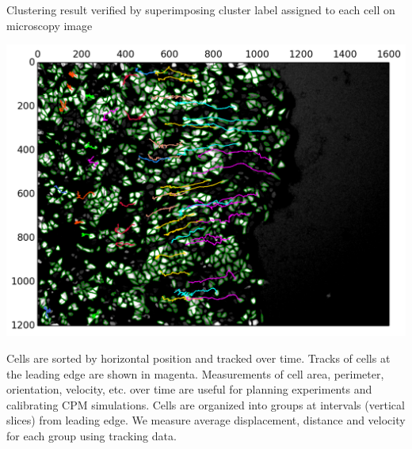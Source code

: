 \documentclass[a0paper,portrait,twocolumn]{baposter}
\begin{document}
\begin{poster}
{\begin{multicols}{2}
\begin{center}
	\smaller
	Clustering result verified by superimposing cluster label assigned to each cell on microscopy image
\end{center}
\end{multicols}
\vspace{-1.5em}
\begin{multicols}{2}
\begin{center}
	\includegraphics[width=\linewidth]{Experiment/Tracking/Track_120.png}
\end{center}
\columnbreak
Cells are sorted by horizontal position and tracked over time. Tracks of cells at the leading edge are shown in magenta. Measurements of cell area, perimeter, orientation, velocity, etc. over time are useful for planning experiments and calibrating CPM simulations. Cells are organized into groups at intervals (vertical slices) from leading edge. We measure average displacement, distance and velocity for each group using tracking data.
\end{multicols}
}


\end{poster}
\end{document}
